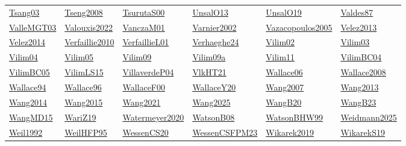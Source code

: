 \begin{longtable}{*{6}{l}}
\hyperref[detail:Tsang03]{Tsang03} & \hyperref[detail:Tseng2008]{Tseng2008} & \hyperref[detail:TsurutaS00]{TsurutaS00} & \hyperref[detail:UnsalO13]{UnsalO13} & \hyperref[detail:UnsalO19]{UnsalO19} & \hyperref[detail:Valdes87]{Valdes87}\\ 
\hyperref[detail:ValleMGT03]{ValleMGT03} & \hyperref[detail:Valouxis2022]{Valouxis2022} & \hyperref[detail:VanczaM01]{VanczaM01} & \hyperref[detail:Varnier2002]{Varnier2002} & \hyperref[detail:Vazacopoulos2005]{Vazacopoulos2005} & \hyperref[detail:Velez2013]{Velez2013}\\ 
\hyperref[detail:Velez2014]{Velez2014} & \hyperref[detail:Verfaillie2010]{Verfaillie2010} & \hyperref[detail:VerfaillieL01]{VerfaillieL01} & \hyperref[detail:Verhaeghe24]{Verhaeghe24} & \hyperref[detail:Vilim02]{Vilim02} & \hyperref[detail:Vilim03]{Vilim03}\\ 
\hyperref[detail:Vilim04]{Vilim04} & \hyperref[detail:Vilim05]{Vilim05} & \hyperref[detail:Vilim09]{Vilim09} & \hyperref[detail:Vilim09a]{Vilim09a} & \hyperref[detail:Vilim11]{Vilim11} & \hyperref[detail:VilimBC04]{VilimBC04}\\ 
\hyperref[detail:VilimBC05]{VilimBC05} & \hyperref[detail:VilimLS15]{VilimLS15} & \hyperref[detail:VillaverdeP04]{VillaverdeP04} & \hyperref[detail:VlkHT21]{VlkHT21} & \hyperref[detail:Wallace06]{Wallace06} & \hyperref[detail:Wallace2008]{Wallace2008}\\ 
\hyperref[detail:Wallace94]{Wallace94} & \hyperref[detail:Wallace96]{Wallace96} & \hyperref[detail:WallaceF00]{WallaceF00} & \hyperref[detail:WallaceY20]{WallaceY20} & \hyperref[detail:Wang2007]{Wang2007} & \hyperref[detail:Wang2013]{Wang2013}\\ 
\hyperref[detail:Wang2014]{Wang2014} & \hyperref[detail:Wang2015]{Wang2015} & \hyperref[detail:Wang2021]{Wang2021} & \hyperref[detail:Wang2025]{Wang2025} & \hyperref[detail:WangB20]{WangB20} & \hyperref[detail:WangB23]{WangB23}\\ 
\hyperref[detail:WangMD15]{WangMD15} & \hyperref[detail:WariZ19]{WariZ19} & \hyperref[detail:Watermeyer2020]{Watermeyer2020} & \hyperref[detail:WatsonB08]{WatsonB08} & \hyperref[detail:WatsonBHW99]{WatsonBHW99} & \hyperref[detail:Weidmann2025]{Weidmann2025}\\ 
\hyperref[detail:Weil1992]{Weil1992} & \hyperref[detail:WeilHFP95]{WeilHFP95} & \hyperref[detail:WessenCS20]{WessenCS20} & \hyperref[detail:WessenCSFPM23]{WessenCSFPM23} & \hyperref[detail:Wikarek2019]{Wikarek2019} & \hyperref[detail:WikarekS19]{WikarekS19}\\ 

\end{longtable}
